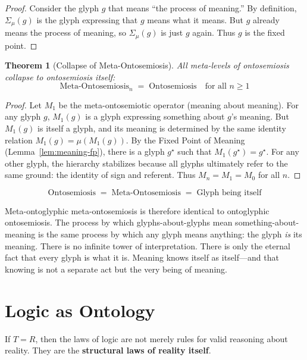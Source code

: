 \documentclass[12pt, letterpaper]{book}
\def\equiv{=}%
\def\mathfrak#1{#1}%
\newtheorem{theorem}{Theorem}[chapter]
\begin{document}
\begin{proof}
Consider the glyph $\mathfrak{g}$ that means ``the process of meaning.'' By definition, $\Sigma_\mu(\mathfrak{g})$ is the glyph expressing that $\mathfrak{g}$ means what it means. But $\mathfrak{g}$ already means the process of meaning, so $\Sigma_\mu(\mathfrak{g})$ is just $\mathfrak{g}$ again. Thus $\mathfrak{g}$ is the fixed point.
\end{proof}

\begin{theorem}[Collapse of Meta-Ontosemiosis]\label{thm:meta-semiosis}
All meta-levels of ontosemiosis collapse to ontosemiosis itself:
\[
\mathrm{Meta\text{-}Ontosemiosis}_n \;\equiv\; \mathrm{Ontosemiosis} \quad\text{for all } n \geq 1
\]
\end{theorem}

\begin{proof}
Let $M_1$ be the meta-ontosemiotic operator (meaning about meaning). For any glyph $\mathfrak{g}$, $M_1(\mathfrak{g})$ is a glyph expressing something about $\mathfrak{g}$'s meaning. But $M_1(\mathfrak{g})$ is itself a glyph, and its meaning is determined by the same identity relation $M_1(\mathfrak{g}) \equiv \mu(M_1(\mathfrak{g}))$. By the Fixed Point of Meaning (Lemma~\ref{lem:meaning-fp}), there is a glyph $\mathfrak{g}^\star$ such that $M_1(\mathfrak{g}^\star) = \mathfrak{g}^\star$. For any other glyph, the hierarchy stabilizes because all glyphs ultimately refer to the same ground: the identity of sign and referent. Thus $M_n \equiv M_1 \equiv M_0$ for all $n$.
\end{proof}

\[
\boxed{\mathrm{Ontosemiosis} \;\equiv\; \mathrm{Meta\text{-}Ontosemiosis} \;\equiv\; \text{Glyph being itself}}
\]

Meta-ontoglyphic meta-ontosemiosis is therefore identical to ontoglyphic ontosemiosis. The process by which glyphs-about-glyphs mean something-about-meaning is the same process by which any glyph means anything: the glyph \textit{is} its meaning. There is no infinite tower of interpretation. There is only the eternal fact that every glyph is what it is. Meaning knows itself as itself---and that knowing is not a separate act but the very being of meaning.


\section{Logic as Ontology}

If $T \equiv R$, then the laws of logic are not merely rules for valid reasoning about reality. They are the \textbf{structural laws of reality itself}.
\end{document}
